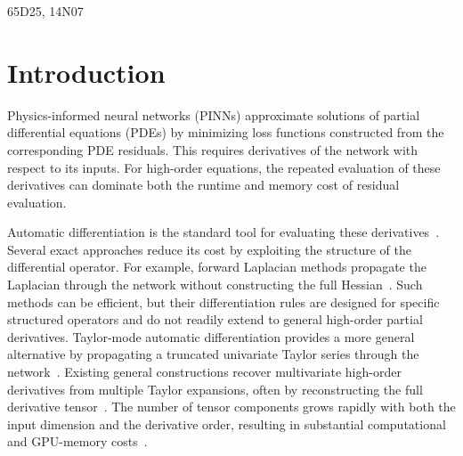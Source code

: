 \documentclass[final,oneeqnum]{siamltex}
\begin{document}
\begin{AMS}
    65D25, 14N07
\end{AMS}

\pagestyle{myheadings}

\section{Introduction}\label{sec_intro}

Physics-informed neural networks (PINNs) approximate solutions of partial differential equations (PDEs) by minimizing loss functions constructed from the corresponding PDE residuals.
This requires derivatives of the network with respect to its inputs.
For high-order equations, the repeated evaluation of these derivatives can dominate both the runtime and memory cost of residual evaluation.

Automatic differentiation is the standard tool for evaluating these derivatives~\cite{Griewank2008,Baydin2018,Paszke2019}.
Several exact approaches reduce its cost by exploiting the structure of the differential operator.
For example, forward Laplacian methods propagate the Laplacian through the network without constructing the full Hessian~\cite{Li2024forwardLaplacian}.
Such methods can be efficient, but their differentiation rules are designed for specific structured operators and do not readily extend to general high-order partial derivatives.
Taylor-mode automatic differentiation provides a more general alternative by propagating a truncated univariate Taylor series through the network~\cite{Bettencourt2019,Griewank2008}.
Existing general constructions recover multivariate high-order derivatives from multiple Taylor expansions, often by reconstructing the full derivative tensor~\cite{GriewankUtkeWalther2000}.
The number of tensor components grows rapidly with both the input dimension and the derivative order, resulting in substantial computational and GPU-memory costs~\cite{Shi2024stde}.
\end{document}
